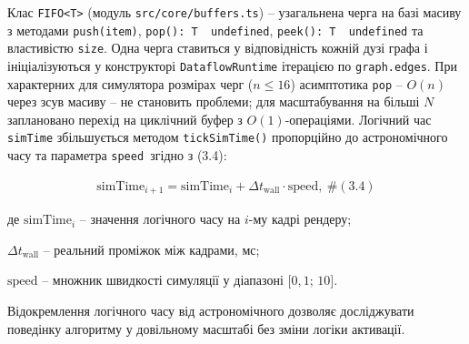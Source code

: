 \documentclass[
]{article}
\newcommand{\passthrough}[1]{#1}
\begin{document}
Клас
\passthrough{\lstinline!FIFO!}\passthrough{\lstinline!<!}\passthrough{\lstinline!T!}\passthrough{\lstinline!>!}
(модуль
\passthrough{\lstinline!src!}\passthrough{\lstinline!/!}\passthrough{\lstinline!core!}\passthrough{\lstinline!/!}\passthrough{\lstinline!buffers!}\passthrough{\lstinline!.!}\passthrough{\lstinline!ts!})
-- узагальнена черга на базі масиву з методами
\passthrough{\lstinline!push!}\passthrough{\lstinline!(!}\passthrough{\lstinline!item!}\passthrough{\lstinline!)!},
\passthrough{\lstinline!pop!}\passthrough{\lstinline!():!}\passthrough{\lstinline! !}\passthrough{\lstinline!T!}\passthrough{\lstinline!  !}\passthrough{\lstinline!undefined!},
\passthrough{\lstinline!peek!}\passthrough{\lstinline!():!}\passthrough{\lstinline! !}\passthrough{\lstinline!T!}\passthrough{\lstinline!  !}\passthrough{\lstinline!undefined!}
та властивістю \passthrough{\lstinline!size!}. Одна черга ставиться у
відповідність кожній дузі графа і ініціалізуються у конструкторі
\passthrough{\lstinline!DataflowRuntime!} ітерацією по
\passthrough{\lstinline!graph!}\passthrough{\lstinline!.!}\passthrough{\lstinline!edges!}.
При характерних для симулятора розмірах черг (\(n \leq 16\)) асимптотика
\passthrough{\lstinline!pop!} -- \(O(n)\) через зсув масиву -- не
становить проблеми; для масштабування на більші \(N\) заплановано
перехід на циклічний буфер з \(O(1)\)-операціями. Логічний час
\passthrough{\lstinline!simTime!} збільшується методом
\passthrough{\lstinline!tickSimTime!}\passthrough{\lstinline!()!}
пропорційно до астрономічного часу та параметра
\passthrough{\lstinline!speed!}\passthrough{\lstinline! !}згідно з
(3.4):

\[\begin{array}{r}
\text{simTime}_{i + 1} = \text{simTime}_{i} + \Delta t_{\text{wall}} \cdot \text{speed},\ \#(3.4)
\end{array}\]

де \(\text{simTime}_{i}\) -- значення логічного часу на \(i\)-му кадрі
рендеру;

\(\Delta t_{\text{wall}}\) -- реальний проміжок між кадрами, мс;

\(\text{speed}\) -- множник швидкості симуляції у діапазоні
\(\lbrack 0,1;\, 10\rbrack\).

Відокремлення логічного часу від астрономічного дозволяє досліджувати
поведінку алгоритму у довільному масштабі без зміни логіки активації.
\end{document}

